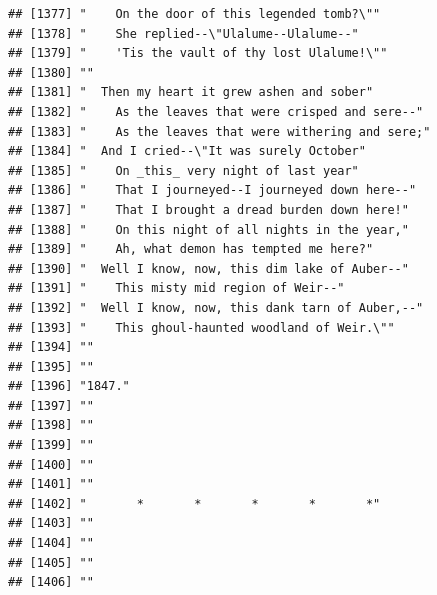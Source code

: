 \documentclass{article}\usepackage[]{graphicx}\usepackage[]{color}
\makeatletter
\newenvironment{kframe}{%
 \def\at@end@of@kframe{}%
 \ifinner\ifhmode%
  \def\at@end@of@kframe{\end{minipage}}%
  \begin{minipage}{\columnwidth}%
 \fi\fi%
 \def\FrameCommand##1{\hskip\@totalleftmargin \hskip-\fboxsep
 \colorbox{shadecolor}{##1}\hskip-\fboxsep
     \hskip-\linewidth \hskip-\@totalleftmargin \hskip\columnwidth}%
 \MakeFramed {\advance\hsize-\width
   \@totalleftmargin\z@ \linewidth\hsize
   \@setminipage}}%
 {\par\unskip\endMakeFramed%
 \at@end@of@kframe}
\newenvironment{knitrout}{}{} %
\makeatother
\begin{document}
\begin{knitrout}
\begin{kframe}
\begin{verbatim}
## [1377] "    On the door of this legended tomb?\""                                    
## [1378] "    She replied--\"Ulalume--Ulalume--"                                       
## [1379] "    'Tis the vault of thy lost Ulalume!\""                                   
## [1380] ""                                                                            
## [1381] "  Then my heart it grew ashen and sober"                                     
## [1382] "    As the leaves that were crisped and sere--"                              
## [1383] "    As the leaves that were withering and sere;"                             
## [1384] "  And I cried--\"It was surely October"                                      
## [1385] "    On _this_ very night of last year"                                       
## [1386] "    That I journeyed--I journeyed down here--"                               
## [1387] "    That I brought a dread burden down here!"                                
## [1388] "    On this night of all nights in the year,"                                
## [1389] "    Ah, what demon has tempted me here?"                                     
## [1390] "  Well I know, now, this dim lake of Auber--"                                
## [1391] "    This misty mid region of Weir--"                                         
## [1392] "  Well I know, now, this dank tarn of Auber,--"                              
## [1393] "    This ghoul-haunted woodland of Weir.\""                                  
## [1394] ""                                                                            
## [1395] ""                                                                            
## [1396] "1847."                                                                       
## [1397] ""                                                                            
## [1398] ""                                                                            
## [1399] ""                                                                            
## [1400] ""                                                                            
## [1401] ""                                                                            
## [1402] "       *       *       *       *       *"                                    
## [1403] ""                                                                            
## [1404] ""                                                                            
## [1405] ""                                                                            
## [1406] ""                                                                            

\end{verbatim}
\end{kframe}
\end{knitrout}
\end{document}
